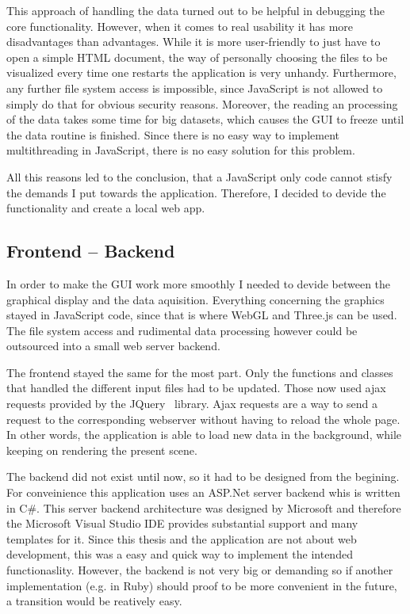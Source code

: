 This approach of handling the data turned out to be helpful in debugging the core functionality. However, when it comes to real usability it has more disadvantages than advantages. While it is more user-friendly to just have to open a simple HTML document, the way of personally choosing the files to be visualized every time one restarts the application is very unhandy. Furthermore, any further file system access is impossible, since JavaScript is not allowed to simply do that for obvious security reasons. Moreover, the reading an processing of the data takes some time for big datasets, which causes the GUI to freeze until the data routine is finished. Since there is no easy way to implement multithreading in JavaScript, there is no easy solution for this problem.

All this reasons led to the conclusion, that a JavaScript only code cannot stisfy the demands I put towards the application. Therefore, I decided to devide the functionality and create a local web app.
\subsection{Frontend -- Backend}
In order to make the GUI work more smoothly I needed to devide between the graphical display and the data aquisition. Everything concerning the graphics stayed in JavaScript code, since that is where WebGL and Three.js can be used. The file system access and rudimental data processing however could be outsourced into a small web server backend.

The frontend stayed the same for the most part. Only the functions and classes that handled the different input files had to be updated. Those now used ajax requests provided by the JQuery~\cite{test} library. Ajax requests are a way to send a request to the corresponding webserver without having to reload the whole page. In other words, the application is able to load new data in the background, while keeping on rendering the present scene.

The backend did not exist until now, so it had to be designed from the begining. For conveinience this application uses an ASP.Net server backend whis is written in C\#. This server backend architecture was designed by Microsoft and therefore the Microsoft Visual Studio IDE provides substantial support and many templates for it. Since this thesis and the application are not about web development, this was a easy and quick way to implement the intended functionaslity. However, the backend is not very big or demanding so if another implementation (e.g. in Ruby) should proof to be more convenient in the future, a transition would be reatively easy.

